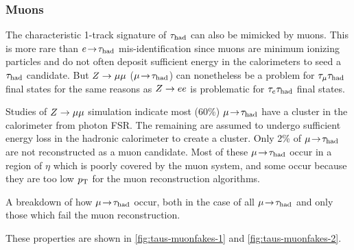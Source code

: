 \subsubsection{Muons}

The characteristic 1-track signature of $\tau_\text{had}$ can also be mimicked by muons. This is more rare than $e \!\rightarrow\!\tau_\text{had}$ mis-identification since muons are minimum ionizing particles and do not often deposit sufficient energy in the calorimeters to seed a $\tau_\text{had}$ candidate. But $Z \rightarrow \mu\mu$ ($\mu \!\rightarrow\!\tau_\text{had}$) can nonetheless be a problem for $\tau_\mu \tau_\text{had}$ final states for the same reasons as $Z \rightarrow ee$ is problematic for $\tau_e \tau_\text{had}$ final states.

Studies of $Z \rightarrow \mu\mu$ simulation indicate most (60\%) $\mu \!\rightarrow\!\tau_\text{had}$ have a cluster in the calorimeter from photon FSR. The remaining are assumed to undergo sufficient energy loss in the hadronic calorimeter to create a cluster. Only 2\% of $\mu \!\rightarrow\!\tau_\text{had}$ are not reconstructed as a muon candidate. Most of these $\mu \!\rightarrow\!\tau_\text{had}$ occur in a region of $\eta$ which is poorly covered by the muon system, and some occur because they are too low $p_{\mathrm{T}}$ for the muon reconstruction algorithms.
%
\begin{table}[bp] 
  \centering
  \renewcommand{\arraystretch}{1.4}
  \caption{A breakdown of how $\mu \!\rightarrow\!\tau_\text{had}$ occur, both in the case of all $\mu \!\rightarrow\!\tau_\text{had}$ and only those which fail the muon reconstruction.}
  
  \label{tab:taus-muonfakes}
\end{table}
%
These properties are shown in \cref{fig:taus-muonfakes-1} and \cref{fig:taus-muonfakes-2}.

